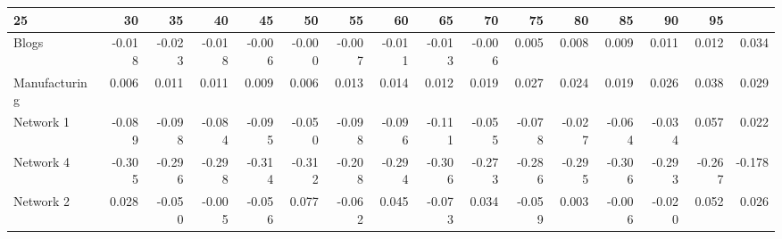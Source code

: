 \begin{tabular}{@{}lrrrrrrrrrrrrrrr@{}}
\toprule

25 & 30 & 35 & 40 & 45 & 50 & 55 & 60 & 65 & 70 & 75 & 80 & 85 & 90 & 95 \\\midrule

Blogs & -0.018 & -0.023 & -0.018 & -0.006 & -0.000 & -0.007 & -0.011 & -0.013 & -0.006 & 0.005 & 0.008 & 0.009 & 0.011 & 0.012 & 0.034 \\
Manufacturing & 0.006 & 0.011 & 0.011 & 0.009 & 0.006 & 0.013 & 0.014 & 0.012 & 0.019 & 0.027 & 0.024 & 0.019 & 0.026 & 0.038 & 0.029 \\
Network
1 & -0.089 & -0.098 & -0.084 & -0.095 & -0.050 & -0.098 & -0.096 & -0.111 & -0.055 & -0.078 & -0.027 & -0.064 & -0.034 & 0.057 & 0.022 \\
Network
4 & -0.305 & -0.296 & -0.298 & -0.314 & -0.312 & -0.208 & -0.294 & -0.306 & -0.273 & -0.286 & -0.295 & -0.306 & -0.293 & -0.267 & -0.178 \\
Network
2 & 0.028 & -0.050 & -0.005 & -0.056 & 0.077 & -0.062 & 0.045 & -0.073 & 0.034 & -0.059 & 0.003 & -0.006 & -0.020 & 0.052 & 0.026 \\

\bottomrule
\end{tabular}
